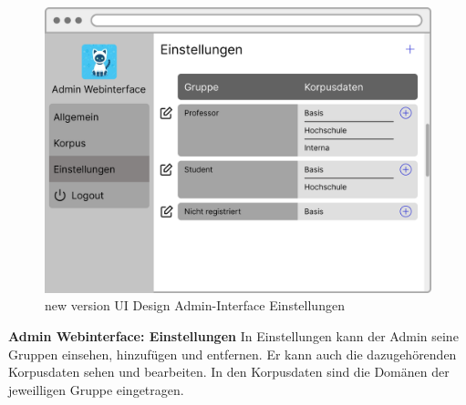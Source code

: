 \begin{figure}[H]
    \centering
    \includegraphics[width=1.0\textwidth]{bilder/new vers. UI Design/Einstellungen/Einstellungen (1).png}
    \caption{new version UI Design Admin-Interface Einstellungen}
    \label{fig:new version UI Design Admin-Interface Einstellungen}
\end{figure}
\noindent \textbf{Admin Webinterface: Einstellungen} \newline
In Einstellungen kann der Admin seine Gruppen einsehen, hinzufügen und entfernen. Er kann auch
die dazugehörenden Korpusdaten sehen und bearbeiten. In den Korpusdaten sind die Domänen der jeweilligen Gruppe eingetragen.

